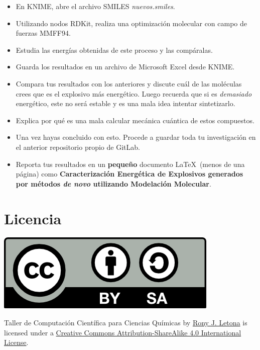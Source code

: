 \documentclass[10pt,letterpaper]{article}
\begin{document}
\begin{itemize}
\item En KNIME, abre el archivo SMILES \textit{nuevos.smiles}.
\item Utilizando nodos RDKit, realiza una optimizaci\'on molecular con campo de fuerzas MMFF94.
\item Estudia las energ\'ias obtenidas de este proceso y las comp\'aralas.
\item Guarda los resultados en un archivo de Microsoft Excel desde KNIME.
\item Compara tus resultados con los anteriores y discute cu\'al de las mol\'eculas crees que es el explosivo m\'as energ\'etico. Luego recuerda que si es \emph{demasiado} energ\'etico, este no ser\'a estable y es una mala idea intentar sintetizarlo.
\item Explica por qu\'e es una mala calcular mec\'anica cu\'antica de estos compuestos.
\item Una vez hayas concluido con esto. Procede a guardar toda tu investigaci\'on en el anterior repositorio propio de GitLab.
\item Reporta tus resultados en un \textbf{peque\~no} documento \LaTeX\ (menos de una p\'agina) como \textbf{Caracterizaci\'on Energ\'etica de Explosivos generados por m\'etodos \emph{de novo} utilizando Modelaci\'on Molecular}.
\end{itemize}

\section*{Licencia}

\noindent \includegraphics{img/cc_big.png}

\noindent Taller de Computaci\'on Cient\'ifica para Ciencias Qu\'imicas by \href{http://github.com/zronyj/TC3Q}{Rony J. Letona} is licensed under a \href{http://creativecommons.org/licenses/by-sa/4.0/}{Creative Commons Attribution-ShareAlike 4.0 International License}.
\end{document}
